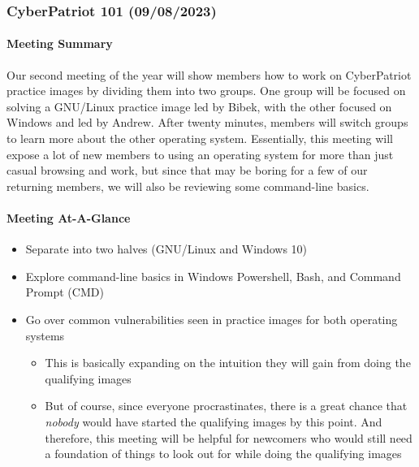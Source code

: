 \documentclass[
  letterpaper,
  DIV=11,
  numbers=noendperiod]{scrartcl}
\let\oldparagraph\paragraph
\renewcommand{\paragraph}[1]{\oldparagraph{#1}\mbox{}}
\providecommand{\tightlist}{%
  \setlength{\itemsep}{0pt}\setlength{\parskip}{0pt}}\usepackage{longtable,booktabs,array}
\begin{document}
\hypertarget{cyberpatriot-101-09082023}{%
\subsubsection{CyberPatriot 101
(09/08/2023)}\label{cyberpatriot-101-09082023}}

\hypertarget{meeting-summary-1}{%
\paragraph{Meeting Summary}\label{meeting-summary-1}}

Our second meeting of the year will show members how to work on
CyberPatriot practice images by dividing them into two groups. One group
will be focused on solving a GNU/Linux practice image led by Bibek, with
the other focused on Windows and led by Andrew. After twenty minutes,
members will switch groups to learn more about the other operating
system. Essentially, this meeting will expose a lot of new members to
using an operating system for more than just casual browsing and work,
but since that may be boring for a few of our returning members, we will
also be reviewing some command-line basics.

\hypertarget{meeting-at-a-glance-1}{%
\paragraph{Meeting At-A-Glance}\label{meeting-at-a-glance-1}}

\begin{itemize}
\tightlist
\item
  Separate into two halves (GNU/Linux and Windows 10)
\item
  Explore command-line basics in Windows Powershell, Bash, and Command
  Prompt (CMD)
\item
  Go over common vulnerabilities seen in practice images for both
  operating systems

  \begin{itemize}
  \tightlist
  \item
    This is basically expanding on the intuition they will gain from
    doing the qualifying images
  \item
    But of course, since everyone procrastinates, there is a great
    chance that \emph{nobody} would have started the qualifying images
    by this point. And therefore, this meeting will be helpful for
    newcomers who would still need a foundation of things to look out
    for while doing the qualifying images
  \end{itemize}
\end{itemize}
\end{document}

